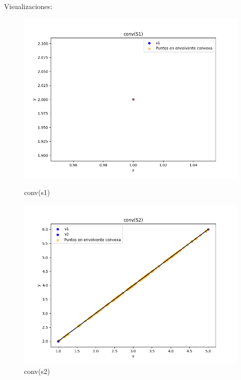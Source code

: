 \documentclass{article}
\begin{document}
Visualizaciones:

\begin{figure}[H]
   \centering
    \begin{minipage}{0.45\textwidth}
        \centering
        \includegraphics[width=\textwidth]{imagenes/conv(s1).png}
        \caption{conv(s1)}
        \label{fig:grafico1}
    \end{minipage}
    \hfill
    \begin{minipage}{0.45\textwidth}
        \centering
        \includegraphics[width=\textwidth]{imagenes/conv(s2).png}
        \caption{conv(s2)}
        \label{fig:grafico2}
    \end{minipage}
\begin{minipage}{0.45\textwidth}

\end{minipage}
\end{figure}
\end{document}
